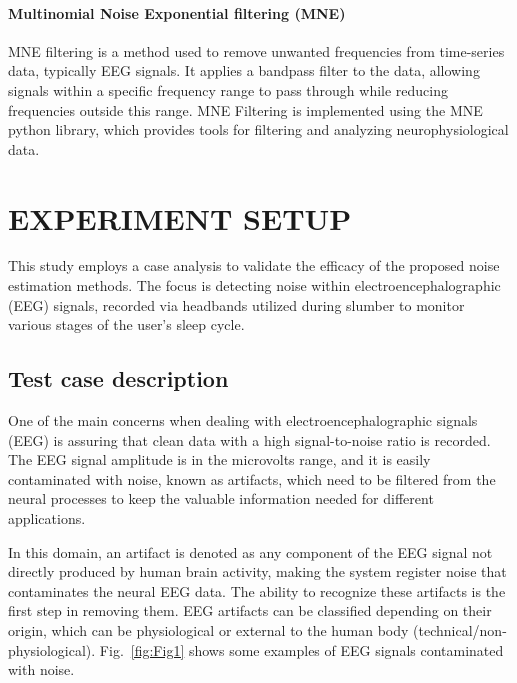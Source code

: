 \documentclass[conference]{IEEEtran}
\begin{document}

\paragraph{Multinomial Noise Exponential filtering (MNE)} MNE filtering is a method used to remove unwanted frequencies from time-series data, typically EEG signals. It applies a bandpass filter to the data, allowing signals within a specific frequency range to pass through while reducing frequencies outside this range. MNE Filtering is implemented using the MNE python library, which provides tools for filtering and analyzing neurophysiological data. 


\section{EXPERIMENT SETUP}
\label{sec:exp}

This study employs a case analysis to validate the efficacy of the proposed noise estimation methods. The focus is detecting noise within electroencephalographic (EEG) signals, recorded via headbands utilized during slumber to monitor various stages of the user's sleep cycle.
\subsection{Test case description} One of the main concerns when dealing with electroencephalographic signals (EEG) is assuring that clean data with a high signal-to-noise ratio is recorded. The EEG signal amplitude is in the microvolts range, and it is easily contaminated with noise, known as artifacts, which need to be filtered from the neural processes to keep the valuable information needed for different applications.

In this domain, an artifact is denoted as any component of the EEG signal not directly produced by human brain activity, making the system register noise that contaminates the neural EEG data. The ability to recognize these artifacts is the first step in removing them. EEG artifacts can be classified depending on their origin, which can be physiological or external to the human body (technical/non-physiological). Fig.~\ref{fig:Fig1} shows some examples of EEG signals contaminated with noise.
\end{document}
